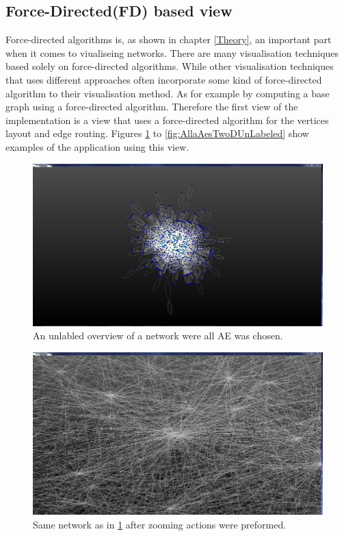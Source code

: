 \documentclass[a4paper,11pt]{kth-mag}
\begin{document}
\subsection{Force-Directed(FD) based view}
\label{FD-based-view}
Force-directed algorithms is, as shown in chapter \ref{Theory}, an important part when it comes to viualiseing networks. There are many visualisation techniques based solely on force-directed algorithms.
While other visualisation techniques that uses different approaches often incorporate some kind of force-directed algorithm to their visualisation method. As for example by computing a base graph using a
 force-directed algorithm. Therefore the first view of the implementation is a view that uses a force-directed algorithm for the vertices layout and edge routing. Figures \ref{fig:AllaAE2} to \ref{fig:AllaAesTwoDUnLabeled}
 show examples of the application using this view.

\begin{figure}[!htbp]
	\centering
	\includegraphics[scale=0.3]{SesammVisualAppPics/2D-View/Unlabled/AE/AllaAE2}
	\caption{An unlabled overview of a network were all AE was chosen.}
	\label{fig:AllaAE2}
\end{figure}

\newpage
\begin{figure}[!htbp]
	\centering
	\includegraphics[scale=0.3]{SesammVisualAppPics/2D-View/Unlabled/AE/AllaAE4}
	\caption{Same network as in \ref{fig:AllaAE2} after zooming actions were preformed.}
	\label{fig:AllaAE4}
\end{figure}
\end{document}
